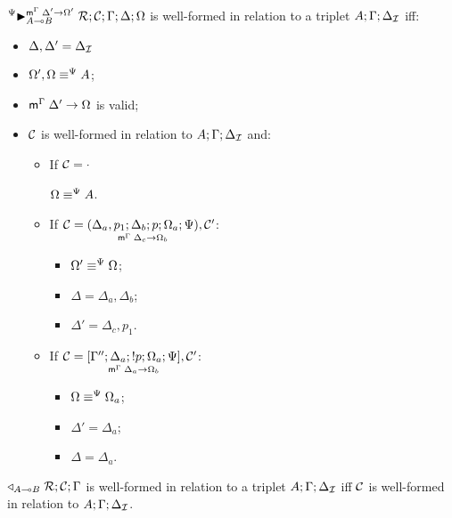 \begin{definition}

$\matstateb{A \lolli B}{\rulestk}{\lstack{C}}{\Gamma}{\Delta}{\Omega}{\Delta'
\rightarrow \Omega'}{\Psi}$ is well-formed in relation to a triplet $A; \Gamma;
\deltan$ iff:

\begin{itemize}[leftmargin=*]
   \item $\Delta, \Delta' = \deltan$
   \item $\feqa{\Omega', \Omega}{A}{\Psi}{\Psi}$;
   \item $\mz{\Gamma}{\Delta'}{\Omega}$ is valid;
   \item $\lstack{C}$ is well-formed in relation to $A; \Gamma; \deltan$ and:
   \begin{itemize}[leftmargin=\secondm]
      \item If $\lstack{C} = \cdot$
   
         $\feqa{\Omega}{A}{\Psi}{\Psi}$.
   
      \item If $\lstack{C} = \lframe{\Delta_a,
   p_1}{\Delta_b}{p}{\Omega_a; \Psi}{\Delta_c}{\Omega_b}, \lstack{C'}$:
      \begin{itemize}[leftmargin=\thirdm]
         \item $\feqa{\Omega'}{\Omega}{\Psi}{\Psi}$;
         \item $\Delta = \Delta_a, \Delta_b$;
         \item $\Delta' = \Delta_c, p_1$.
      \end{itemize}

      \item If $\lstack{C} = \pframe{\Gamma''}{\Delta_a}{\bang
         p}{\Omega_a; \Psi}{\Delta_a}{\Omega_b}, \lstack{C'}$:
      \begin{itemize}[leftmargin=\thirdm]
         \item $\feqa{\Omega}{\Omega_a}{\Psi}{\Psi}$;
         \item $\Delta' = \Delta_a$;
         \item $\Delta = \Delta_a$.
      \end{itemize}
   \end{itemize}
\end{itemize}

\end{definition}

\begin{definition}

$\contstate{A \lolli B}{\rulestk}{\lstack{C}}{\Gamma}$ is well-formed in
relation to a triplet $A; \Gamma; \deltan$ iff $\lstack{C}$ is well-formed in
relation to $A; \Gamma; \deltan$.

\end{definition}

